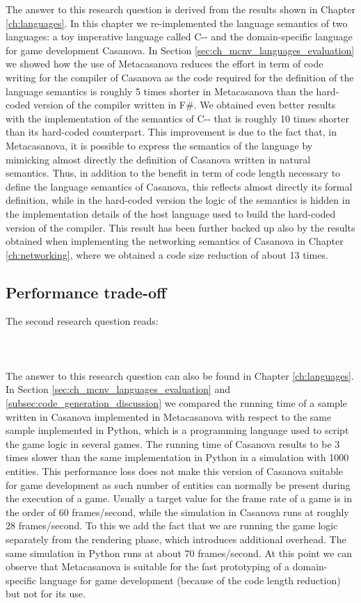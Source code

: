 The answer to this research question is derived from the results shown in Chapter \ref{ch:languages}. In this chapter we re-implemented the language semantics of two languages: a toy imperative language called C-{}- and the domain-specific language for game development Casanova. In Section \ref{sec:ch_mcnv_languages_evaluation} we showed how the use of Metacasanova reduces the effort in term of code writing for the compiler of Casanova as the code required for the definition of the language semantics is roughly 5 times shorter in Metacasanova than the hard-coded version of the compiler written in F\#. We obtained even better results with the implementation of the semantics of C-{}- that is roughly 10 times shorter than its hard-coded counterpart. This improvement is due to the fact that, in Metacasanova, it is possible to express the semantics of the language by mimicking almost directly the definition of Casanova written in natural semantics. Thus, in addition to the benefit in term of code length necessary to define the language semantics of Casanova, this reflects almost directly its formal definition, while in the hard-coded version the logic of the semantics is hidden in the implementation details of the host language used to build the hard-coded version of the compiler. This result has been further backed up also by the results obtained when implementing the networking semantics of Casanova in Chapter \ref{ch:networking}, where we obtained a code size reduction of about 13 times.

\subsection{Performance trade-off}
\label{subsec:ch_conclusion_rq2}
The second research question reads:\\\\
\researchQuestion{\rqContentTwo}\\\\

The answer to this research question can also be found in Chapter \ref{ch:languages}. In Section  \ref{sec:ch_mcnv_languages_evaluation} and \ref{subsec:code_generation_discussion} we compared the running time of a sample written in Casanova implemented in Metacasanova with respect to the same sample implemented in Python, which is a programming language used to script the game logic in several games. The running time of Casanova results to be 3 times slower than the same implementation in Python in a simulation with 1000 entities. This performance loss does not make this version of Casanova suitable for game development as such number of entities can normally be present during the execution of a game. Usually a target value for the frame rate of a game is in the order of 60 frames/second, while the simulation in Casanova runs at roughly 28 frames/second. To this we add the fact that we are running the game logic separately from the rendering phase, which introduces additional overhead. The same simulation in Python runs at about 70 frames/second. At this point we can observe that Metacasanova is suitable for the fast prototyping of a domain-specific language for game development (because of the code length reduction) but not for its use.

